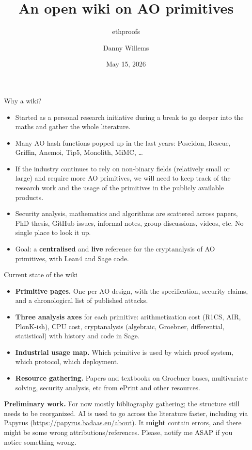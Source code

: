 \documentclass[aspectratio=169]{beamer}
\title{An open wiki on AO primitives}
\subtitle{ethproofs}
\author{Danny Willems}
\date{May 15, 2026}
\begin{document}
\begin{frame}
  \titlepage{}
\end{frame}

\begin{frame}{Why a wiki?}
  \begin{itemize}
    \item Started as a personal research initiative during a break to go deeper
	  into the maths and gather the whole literature.
    \item Many AO hash functions popped up in the last years:
          Poseidon, Rescue, Griffin, Anemoi, Tip5, Monolith, MiMC, \ldots
    \item If the industry continues to rely on non-binary fields
	(relatively small or large) and require more AO primitives, we will need
	to keep track of the research work and the usage of the
        primitives in the publicly available products.
    \item Security analysis, mathematics and algorithms are scattered across
	papers, PhD thesis, GitHub issues, informal notes, group discussions,
	videos, etc. No single place to look it up.
    \item Goal: a \textbf{centralised} and \textbf{live} reference for the
	cryptanalysis of AO primitives, with Lean4 and Sage code.
  \end{itemize}
\end{frame}

\begin{frame}{Current state of the wiki}
  \begin{itemize}
    \item \textbf{Primitive pages.} One per AO design, with the
          specification, security claims, and a chronological list of
          published attacks.
    \item \textbf{Three analysis axes} for each primitive:
          arithmetization cost (R1CS, AIR, PlonK-ish), CPU cost,
          cryptanalysis (algebraic, Groebner, differential,
	  statistical) with history and code in Sage.
    \item \textbf{Industrial usage map.} Which primitive is used by
          which proof system, which protocol, which deployment.
    \item \textbf{Resource gathering.} Papers and textbooks on
	  Groebner bases, multivariate solving, security analysis, etc from
	  ePrint and other resources.
  \end{itemize}
  \vspace{0.3em}
  \small \textbf{Preliminary work.} For now mostly bibliography
  gathering; the structure still needs to be reorganized.
  AI is used to go across the literature faster, including via
  Papyrus (\url{https://papyrus.badaas.eu/about}).
  It \textbf{might} contain errors, and there might be some wrong
  attributions/references. Please, notify me ASAP if you notice something
  wrong.
\end{frame}
\end{document}
